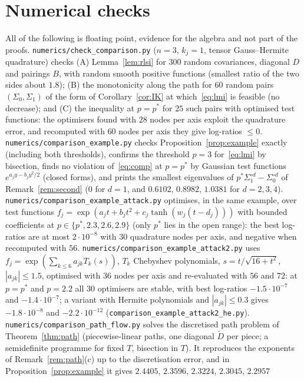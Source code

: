 \documentclass[11pt]{amsart}
\theoremstyle{definition}
\begin{document}
\section{Numerical checks}\label{sec:num}
All of the following is floating point, evidence for the algebra and not part of the proofs.
\texttt{numerics/check\_comparison.py} ($n=3$, $k_j=1$, tensor Gauss--Hermite quadrature) checks (A) Lemma~\ref{lem:rlsi}
for $300$ random covariances, diagonal $D$ and pairings $B$, with random smooth positive functions (smallest
ratio of the two sides about $1.8$); (B) the monotonicity along the path for $60$ random pairs $(\Sigma_0,\Sigma_1)$
of the form of Corollary~\ref{cor:IK} at which~\eqref{eq:lmi} is feasible (no decrease); and (C) the inequality at
$p=p^*$ for $25$ such pairs with optimised test functions: the optimisers found with $28$ nodes per axis exploit the
quadrature error, and recomputed with $60$ nodes per axis they give log-ratios $\le0$.
\texttt{numerics/comparison\_example.py} checks Proposition~\ref{prop:example} exactly (including both thresholds), confirms
the threshold $p=3$ for~\eqref{eq:lmi} by bisection, finds no violation of~\eqref{eq:comp} at $p=p^*$
by Gaussian test functions $e^{a_jy-b_jy^2/2}$ (closed forms), and prints the smallest eigenvalues of
$p^*\Sigma_1^{\circ d}-\Sigma_0^{\circ d}$ of Remark~\ref{rem:second} ($0$ for $d=1$, and $0.6102$, $0.8982$, $1.0381$ for
$d=2,3,4$). \texttt{numerics/comparison\_example\_attack.py} optimises, in the same example, over test
functions $f_j=\exp(a_jt+b_jt^2+c_j\tanh(w_j(t-d_j)))$ with bounded coefficients at $p\in\{p^*,2.3,2.6,2.9\}$ (only
$p^*$ lies in the open range): the best log-ratios are at most $2\cdot10^{-8}$ with $30$ quadrature nodes per axis,
and negative when recomputed with $56$. \texttt{numerics/comparison\_example\_attack2.py} uses
$f_j=\exp(\sum_{k\le6}a_{jk}T_k(s))$, $T_k$ Chebyshev polynomials, $s=t/\sqrt{16+t^2}$, $|a_{jk}|\le1.5$, optimised with
$36$ nodes per axis and re-evaluated with $56$ and $72$: at $p=p^*$ and $p=2.2$ all $30$ optimisers are stable, with best
log-ratios $-1.5\cdot10^{-7}$ and $-1.4\cdot10^{-7}$; a variant with Hermite polynomials and $|a_{jk}|\le0.3$ gives
$-1.8\cdot10^{-8}$ and $-2.2\cdot10^{-12}$ (\texttt{comparison\_example\_attack2\_he.py}). \texttt{numerics/comparison\_path\_flow.py} solves the discretised path
problem of Theorem~\ref{thm:path} (piecewise-linear paths, one diagonal $\tilde D$ per piece; a semidefinite
programme for fixed $T$, bisection in $T$). It reproduces the exponents of Remark~\ref{rem:path}(c) up to the
discretisation error, and in Proposition~\ref{prop:example} it gives $2.4405$, $2.3596$, $2.3224$, $2.3045$, $2.2957$
\end{document}
